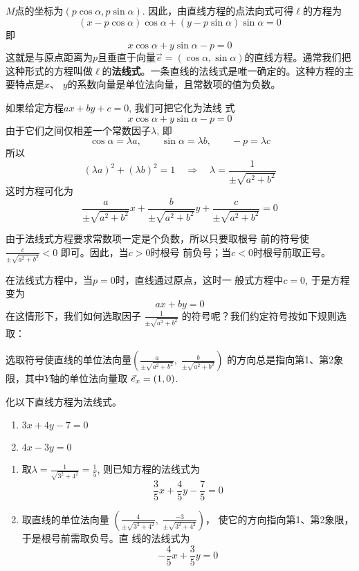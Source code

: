 $M$点的坐标为$(p\cos\alpha, p\sin\alpha)$. 
因此，由直线方程的点法向式可得$\ell$的方程为
\[(x-p\cos\alpha)\cos\alpha+(y-p\sin\alpha)\sin\alpha=0\]
即
\[x\cos\alpha+y\sin\alpha-p=0\]
这就是与原点距离为$p$且垂直于向量$\vec{e}=(\cos\alpha,\sin\alpha)$的直线方程。通常我们把这种形式的方程叫做$\ell$的\textbf{法线式}。一条直线的法线式是唯一确定的。这种方程的主要特点是$x$、
$y$的系数向量是单位法向量，且常数项的值为负数。

如果给定方程$ax+by+c=0$, 我们可把它化为法线
式
\[x\cos\alpha+y\sin\alpha-p=0\]
由于它们之间仅相差一个常数因子$\lambda$, 即
\[\cos\alpha=\lambda a,\qquad \sin\alpha=\lambda b,\qquad -p=\lambda c\]
所以
\[(\lambda a)^2+(\lambda b)^2=1 \quad \Rightarrow\quad 
\lambda=\frac{1}{\pm\sqrt{a^2+b^2}}\]
这时方程可化为
\[\frac{a}{\pm\sqrt{a^2+b^2}}x+\frac{b}{\pm\sqrt{a^2+b^2}}y+\frac{c}{\pm\sqrt{a^2+b^2}}=0\]

由于法线式方程要求常数项一定是个负数，所以只要取根号
前的符号使$\frac{c}{\pm\sqrt{a^2+b^2}}<0$
即可。因此，当$c>0$时根号
前负号；当$c<0$时根号前取正号。

在法线式方程中，当$p=0$时，直线通过原点，这时一
般式方程中$c=0$, 于是方程变为
\[ax+by=0\]
在这情形下，我们如何选取因子
$\frac{1}{\pm\sqrt{a^2+b^2}}$
的符号呢？我们约定符号按如下规则选取：

选取符号使直线的单位法向量$\left(\frac{a}{\pm\sqrt{a^2+b^2}},\; \frac{b}{\pm\sqrt{a^2+b^2}}\right)$
的方向总是指向第1、第2象限，其中$Y$轴的单位法向量取
$\vec{e}_x=(1,0)$.


\begin{example}
    化以下直线方程为法线式。
\begin{multicols}{2}
\begin{enumerate}
    \item $3x+4y-7=0$
    \item $4x-3y=0$
\end{enumerate} 
\end{multicols}
\end{example}


\begin{solution}
\begin{enumerate}
    \item 取$\lambda=\frac{1}{\sqrt{3^2+4^2}}=\frac{1}{5}$, 
    则已知方程的法线式为
    \[\frac{3}{5}x+\frac{4}{5}y-\frac{7}{5}=0\]
\item 取直线的单位法向量
$\left(\frac{4}{\pm\sqrt{3^2+4^2}},\; \frac{-3}{\pm\sqrt{3^2+4^2}}\right)$，
    使它的方向指向第1、第2象限，于是根号前需取负号。直
    线的法线式为
\[-\frac{4}{5}x+\frac{3}{5}y=0\] 
\end{enumerate}
\end{solution}

